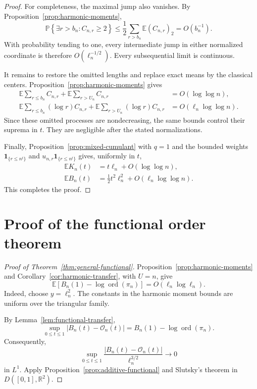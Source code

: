 \documentclass[11pt]{article}
\theoremstyle{definition}
\theoremstyle{remark}
\newcommand{\Pp}{\mathbb P}
\newcommand{\Ee}{\mathbb E}
\newcommand{\one}{\mathbf 1}
\newcommand{\ord}{\operatorname{ord}}
\newcommand{\cO}{\mathcal O}
\newcommand{\R}{\mathbb R}
\begin{document}
\begin{proof}
For completeness, the maximal jump also vanishes.  By
Proposition~\ref{prop:harmonic-moments},
\[
 \Pp\left\{\exists r>b_n:C_{n,r}\ge2\right\}
 \le\frac12\sum_{r>b_n}\Ee(C_{n,r})_2
 =O(b_n^{-1}).
\]
With probability tending to one, every intermediate jump in either
normalized coordinate is therefore $O(\ell_n^{-1/2})$.  Every subsequential
limit is continuous.

It remains to restore the omitted lengths and replace exact means by the
classical centers.  Proposition~\ref{prop:harmonic-moments} gives
\begin{align*}
 \Ee\sum_{r\le b_n}C_{n,r}
 +\Ee\sum_{r>U_n}C_{n,r}
 &=O(\log\log n),\\
 \Ee\sum_{r\le b_n}(\log r)C_{n,r}
 +\Ee\sum_{r>U_n}(\log r)C_{n,r}
 &=O(\ell_n\log\log n).
\end{align*}
Since these omitted processes are nondecreasing, the same bounds control
their suprema in $t$.  They are negligible after the stated
normalizations.

Finally, Proposition~\ref{prop:mixed-cumulant} with $q=1$ and the bounded
weights
$\one_{\{r\le n^t\}}$ and
$u_{n,r}\one_{\{r\le n^t\}}$ gives, uniformly in $t$,
\begin{align*}
 \Ee K_n(t)&=t\ell_n+O(\log\log n),\\
 \Ee B_n(t)&=\frac12t^2\ell_n^2+O(\ell_n\log\log n).
\end{align*}
This completes the proof.
\end{proof}

\section{Proof of the functional order theorem}

\begin{proof}[Proof of Theorem~\ref{thm:general-functional}]
Proposition~\ref{prop:harmonic-moments} and
Corollary~\ref{cor:harmonic-transfer}, with $U=n$, give
\[
 \Ee\left[
 B_n(1)-\log\ord(\pi_n)
 \right]
 =
 O(\ell_n\log\ell_n).
\]
Indeed, choose $y=\ell_n^2$.  The constants in the harmonic moment bounds
are uniform over the triangular family.

By Lemma~\ref{lem:functional-transfer},
\[
 \sup_{0\le t\le1}
 \left|B_n(t)-\cO_n(t)\right|
 =
 B_n(1)-\log\ord(\pi_n).
\]
Consequently,
\[
 \sup_{0\le t\le1}
 \frac{|B_n(t)-\cO_n(t)|}{\ell_n^{3/2}}
 \longrightarrow0
\]
in $L^1$.  Apply Proposition~\ref{prop:additive-functional} and Slutsky's
theorem in $D([0,1],\R^2)$.
\end{proof}
\end{document}
